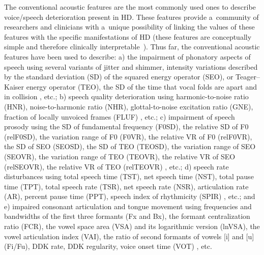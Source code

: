 The conventional acoustic features are the most commonly used ones to describe voice/speech deterioration present in HD. These features provide a~community of researchers and clinicians with a~unique possibility of linking the values of these features with the specific manifestations of HD (these features are conceptually simple and therefore clinically interpretable~\cite{Smekal2015b}). Thus far, the conventional acoustic features have been used to describe: a) the impairment of phonatory aspects of speech using several variants of jitter and shimmer, intensity variations described by the standard deviation (SD) of the squared energy operator (SEO), or Teager–Kaiser energy operator (TEO), the SD of the time that vocal folds are apart and in collision \cite{Little2007, Gelzinis2008, Silva2009, Little2009, Tsanas2010, Tsanas2010b, Smekal2015c, Naranjo2016}, etc.; b) speech quality deterioration using harmonic-to-noise ratio (HNR), noise-to-harmonic ratio (NHR), glottal-to-noise excitation ratio (GNE), fraction of locally unvoiced frames (FLUF) \cite{Michaelis1997, Little2007, Gelzinis2008, Little2009, Smekal2015c, Naranjo2016}, etc.; c) impairment of speech prosody using the SD of fundamental frequency (F0SD), the relative SD of F0 (relF0SD), the variation range of F0 (F0VR), the relative VR of F0 (relF0VR), the SD of SEO (SEOSD), the SD of TEO (TEOSD), the variation range of SEO (SEOVR), the variation range of TEO (TEOVR), the relative VR of SEO (relSEOVR), the relative VR of TEO (relTEOVR) \cite{Galaz2016, Skodda2009, Skodda2010}, etc.; d) speech rate disturbances using total speech time (TST), net speech time (NST), total pause time (TPT), total speech rate (TSR), net speech rate (NSR), articulation rate (AR), percent pause time (PPT), speech index of rhythmicity (SPIR) \cite{Rusz2011, Galaz2016, Skodda2009, Skodda2010, Skodda2011b}, etc.; and e) impaired consonant articulation and tongue movement using frequencies and bandwidths of the first three formants (Fx and Bx), the formant centralization ratio (FCR), the vowel space area (VSA) and its logarithmic version (lnVSA), the vowel articulation index (VAI), the ratio of second formants of vowels [i] and [u] (Fi/Fu), DDK rate, DDK regularity, voice onset time (VOT) \cite{Forrest1989, Sapir2010, Rusz2011, Skodda2011, Rusz2013}, etc.

